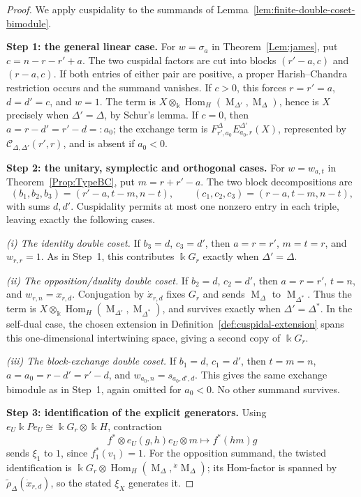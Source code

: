 \documentclass[12pt]{amsart}
\numberwithin{itemcounter}{subsection}
\theoremstyle{plain}
\theoremstyle{definition}
\theoremstyle{remark}
\numberwithin{equation}{section}
\def\k{\Bbbk}
\def\M{{\operatorname{M}\nolimits}}
\def\Hom{\operatorname{Hom}\nolimits}
\def\Hom{\operatorname{Hom}}
\begin{document}
\begin{proof}
We apply cuspidality to the summands of
Lemma~\ref{lem:finite-double-coset-bimodule}.

\smallskip
\noindent\textbf{Step 1: the general linear case.}
For \(w=\sigma_a\) in Theorem~\ref{Lem:james}, put \(c=n-r-r'+a\).
The two cuspidal factors are cut into blocks \((r'-a,c)\) and
\((r-a,c)\).  If both entries of either pair are positive, a proper
Harish--Chandra restriction occurs and the summand vanishes.
If \(c>0\), this forces \(r=r'=a\), \(d=d'=c\), and \(w=1\).
The term is \(X\otimes_\k\Hom_H(\M_{\Delta'},\M_\Delta)\), hence is
\(X\) precisely when \(\Delta'=\Delta\), by Schur's lemma.
If \(c=0\), then \(a=r-d'=r'-d=:a_0\); the exchange term is
\(F^\Delta_{r',a_0}E^{\Delta'}_{a_0,r}(X)\), represented by
\(\mathscr C_{\Delta,\Delta'}(r',r)\), and is absent if \(a_0<0\).

\smallskip
\noindent\textbf{Step 2: the unitary, symplectic and orthogonal cases.}
For \(w=w_{a,t}\) in Theorem~\ref{Prop:TypeBC}, put \(m=r+r'-a\).
The two block decompositions are
\[
(b_1,b_2,b_3)=(r'-a,t-m,n-t),\qquad
(c_1,c_2,c_3)=(r-a,t-m,n-t),
\]
with sums \(d,d'\).  Cuspidality permits at most one nonzero entry in
each triple, leaving exactly the following cases.

\smallskip
\noindent\emph{(i) The identity double coset.}
If \(b_3=d\), \(c_3=d'\), then \(a=r=r'\), \(m=t=r\), and
\(w_{r,r}=1\).  As in Step~1, this contributes \(\k G_r\) exactly
when \(\Delta'=\Delta\).

\smallskip
\noindent\emph{(ii) The opposition/duality double coset.}
If \(b_2=d\), \(c_2=d'\), then \(a=r=r'\), \(t=n\), and
\(w_{r,n}=x_{r,d}\).  Conjugation by \(\dot x_{r,d}\) fixes \(G_r\)
and sends \(\M_\Delta\) to \(\M_{\Delta^*}\).  Thus the term is
\(X\otimes_\k\Hom_H(\M_{\Delta'},\M_{\Delta^*})\), and survives
exactly when \(\Delta'=\Delta^*\).  In the self-dual case, the chosen
extension in Definition~\ref{def:cuspidal-extension} spans this
one-dimensional intertwining space, giving a second copy of \(\k G_r\).

\smallskip
\noindent\emph{(iii) The block-exchange double coset.}
If \(b_1=d\), \(c_1=d'\), then \(t=m=n\), \(a=a_0=r-d'=r'-d\),
and \(w_{a_0,n}=s_{a_0,d',d}\).  This gives the same exchange bimodule
as in Step~1, again omitted for \(a_0<0\).  No other summand survives.

\smallskip
\noindent\textbf{Step 3: identification of the explicit generators.}
Using \(e_U\k Pe_U\cong\k G_r\otimes\k H\), contraction
\[
f^*\otimes e_U(g,h)e_U\otimes m\longmapsto f^*(hm)g
\]
sends \(\xi_1\) to \(1\), since \(f_1^*(v_1)=1\).
For the opposition summand, the twisted identification is
\(\k G_r\otimes\Hom_H(\M_\Delta,{}^{\dot x}\M_\Delta)\);
its Hom-factor is spanned by \(\widetilde\rho_\Delta(\dot x_{r,d})\),
so the stated \(\xi_X\) generates it.


\end{proof}
\end{document}
